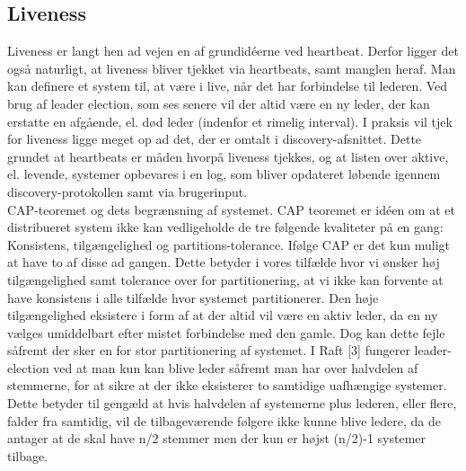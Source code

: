 \documentclass[a4paper,12pt]{article}
\begin{document}
\subsection{Liveness} 
Liveness er langt hen ad vejen en af grundidéerne ved heartbeat. Derfor ligger det også naturligt, at liveness bliver tjekket via heartbeats, samt manglen heraf. Man kan definere et system til, at være i live, når det har forbindelse til lederen. Ved brug af leader election, som ses senere vil der altid være en ny leder, der kan erstatte en afgående, el. død leder (indenfor et rimelig interval). I praksis vil tjek for liveness ligge meget op ad det, der er omtalt i discovery-afsnittet.
Dette grundet at heartbeats er måden hvorpå liveness tjekkes, og at listen over aktive, el. levende, systemer opbevares i en log, som bliver opdateret løbende igennem discovery-protokollen samt via brugerinput.
\\
CAP-teoremet og dets begrænsning af systemet.
CAP teoremet er idéen om at et distribueret system ikke kan vedligeholde de tre følgende kvaliteter på en gang: Konsistens, tilgængelighed og partitions-tolerance. Ifølge CAP er det kun muligt at have to af disse ad gangen. Dette betyder i vores tilfælde hvor vi ønsker høj tilgængelighed samt tolerance over for partitionering, at vi ikke kan forvente at have konsistens i alle tilfælde hvor systemet partitionerer.
Den høje tilgængelighed eksistere i form af at der altid vil være en aktiv leder, da en ny vælges umiddelbart efter mistet forbindelse med den gamle.
Dog kan dette fejle såfremt der sker en for stor partitionering af systemet. 
I Raft [3] fungerer leader-election ved at man kun kan blive leder såfremt man har over halvdelen af stemmerne, for at sikre at der ikke eksisterer to samtidige uafhængige systemer. Dette betyder til gengæld at hvis halvdelen af systemerne plus lederen, eller flere, falder fra samtidig, vil de tilbageværende følgere ikke kunne blive ledere, da de antager at de skal have n/2 stemmer men der kun er højst (n/2)-1 systemer tilbage. 
\end{document}
